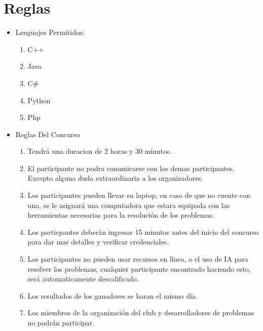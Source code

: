 \documentclass{article}
\begin{document}
\section{Reglas}
\begin{itemize}
    \item Lenguajes Permitidos:
          \begin{enumerate}
              \item C++
              \item Java
              \item C\#
              \item Python
              \item Php
          \end{enumerate}
    \item Reglas Del Concurso
          \begin{enumerate}
              \item Tendrá una duracion de 2 horas y 30 minutos.
              \item El participante no podra comunicarse con los demas participantes. Excepto alguna duda extraordinaria a los organizadores.
              \item Los participantes pueden llevar su laptop, en caso de que no cuente con una, se le asignará una computadora que estara equipada con las herramientas necesarias para la resolución de los problemas.
              \item Los particpantes deberán ingresar 15 minutos antes del inicio del concurso para dar mas detalles y verificar credenciales.
              \item Los participantes no pueden usar recursos en línea, o el uso de IA para resolver los problemas, cualquier participante encontrado haciendo esto, será automaticamente descalificado.
              \item Los resultados de los ganadores se haran el mismo día.
              \item Los miembros de la organización del club y desarrolladores de problemas no podrán participar.
          \end{enumerate}
\end{itemize}
\end{document}
